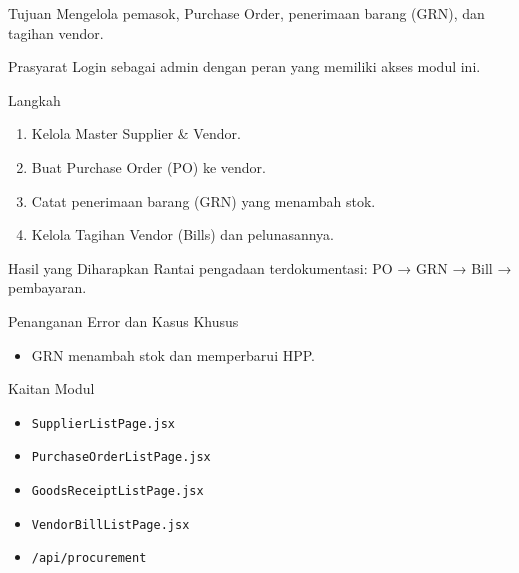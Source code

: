 
\begin{flowsection}{Tujuan}
Mengelola pemasok, Purchase Order, penerimaan barang (GRN), dan tagihan vendor.
\end{flowsection}

\begin{flowsection}{Prasyarat}
Login sebagai admin dengan peran yang memiliki akses modul ini.
\end{flowsection}

\begin{flowsection}{Langkah}
\begin{enumerate}
  \item Kelola Master Supplier \&  Vendor.
  \item Buat Purchase Order (PO) ke vendor.
  \item Catat penerimaan barang (GRN) yang menambah stok.
  \item Kelola Tagihan Vendor (Bills) dan pelunasannya.
\end{enumerate}
\end{flowsection}


\begin{flowsection}{Hasil yang Diharapkan}
Rantai pengadaan terdokumentasi: PO → GRN → Bill → pembayaran.
\end{flowsection}

\begin{flowsection}{Penanganan Error dan Kasus Khusus}
\begin{itemize}
  \item GRN menambah stok dan memperbarui HPP.
\end{itemize}
\end{flowsection}

\begin{flowsection}{Kaitan Modul}
\begin{itemize}
  \item \texttt{SupplierListPage.jsx}
  \item \texttt{PurchaseOrderListPage.jsx}
  \item \texttt{GoodsReceiptListPage.jsx}
  \item \texttt{VendorBillListPage.jsx}
  \item \texttt{/api/procurement}
\end{itemize}
\end{flowsection}

